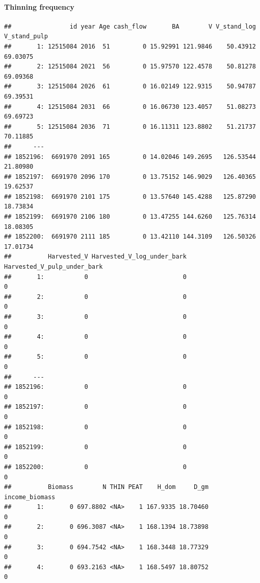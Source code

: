 \documentclass[]{elsarticle} %
\begin{document}
\paragraph{Thinning frequency}\label{thinning-frequency}

\begin{verbatim}
##                id year Age cash_flow       BA        V V_stand_log V_stand_pulp
##       1: 12515084 2016  51         0 15.92991 121.9846    50.43912     69.03075
##       2: 12515084 2021  56         0 15.97570 122.4578    50.81278     69.09368
##       3: 12515084 2026  61         0 16.02149 122.9315    50.94787     69.39531
##       4: 12515084 2031  66         0 16.06730 123.4057    51.08273     69.69723
##       5: 12515084 2036  71         0 16.11311 123.8802    51.21737     70.11885
##      ---                                                                       
## 1852196:  6691970 2091 165         0 14.02046 149.2695   126.53544     21.80980
## 1852197:  6691970 2096 170         0 13.75152 146.9029   126.40365     19.62537
## 1852198:  6691970 2101 175         0 13.57640 145.4288   125.87290     18.73834
## 1852199:  6691970 2106 180         0 13.47255 144.6260   125.76314     18.08305
## 1852200:  6691970 2111 185         0 13.42110 144.3109   126.50326     17.01734
##          Harvested_V Harvested_V_log_under_bark Harvested_V_pulp_under_bark
##       1:           0                          0                           0
##       2:           0                          0                           0
##       3:           0                          0                           0
##       4:           0                          0                           0
##       5:           0                          0                           0
##      ---                                                                   
## 1852196:           0                          0                           0
## 1852197:           0                          0                           0
## 1852198:           0                          0                           0
## 1852199:           0                          0                           0
## 1852200:           0                          0                           0
##          Biomass        N THIN PEAT    H_dom     D_gm income_biomass
##       1:       0 697.8802 <NA>    1 167.9335 18.70460              0
##       2:       0 696.3087 <NA>    1 168.1394 18.73898              0
##       3:       0 694.7542 <NA>    1 168.3448 18.77329              0
##       4:       0 693.2163 <NA>    1 168.5497 18.80752              0

\end{verbatim}
\end{document}
